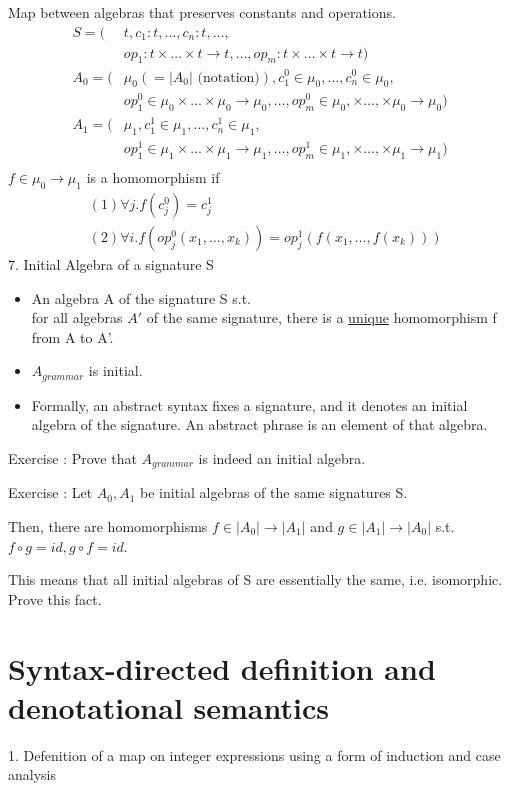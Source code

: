 \documentclass{report}[12pt]
\begin{document}
Map between algebras that preserves constants and operations.
\begin{align*}
    S=(&t, c_1:t, \ldots, c_n:t, \ldots, \\
    &op_1 :t\times \ldots \times t \rightarrow t , \ldots, op_m : t \times \ldots \times t \rightarrow t) \\
    A_0 = (&\mu_0(=|A_0|\text{ (notation)}), c_1^0 \in \mu_0, \ldots, c_n^0 \in \mu_0, \\
    &op_1^0 \in \mu_0 \times \ldots \times \mu_0 \rightarrow \mu_0, \ldots, op_m^0 \in \mu_0, \times \ldots, \times \mu_0 \rightarrow \mu_0) \\
    A_1 = (&\mu_1, c_1^1 \in \mu_1, \ldots, c_n^1 \in \mu_1, \\
    &op_1^1 \in \mu_1 \times \ldots \times \mu_1 \rightarrow \mu_1, \ldots, op_m^1 \in \mu_1, \times \ldots, \times \mu_1 \rightarrow \mu_1) \\
\end{align*}
$f\in \mu_0 \rightarrow \mu_1$ is a homomorphism if
\begin{align*}
    &(1) \forall j. f(c_j^0) = c_j^1  \\
    &(2) \forall i. f(op_j^0(x_1, \ldots, x_k)) = op_j^1 (f(x_1, \ldots, f(x_k)))
\end{align*}
7. Initial Algebra of a signature S

\begin{itemize}
    \item An algebra A of the signature S s.t. \\
    for all algebras $A'$ of the same signature, there is a \underline{unique} homomorphism f from A to A'.
    \item $A_{grammar}$ is initial.
    \item Formally, an abstract syntax fixes a signature, and it denotes an initial algebra of the signature. An abstract phrase is an element of that algebra.
\end{itemize}
Exercise : Prove that $A_{grammar}$ is indeed an initial algebra.

Exercise : Let $A_0, A_1$ be initial algebras of the same signatures S.

Then, there are homomorphisms $f\in |A_0| \rightarrow |A_1|$ and $g \in |A_1| \rightarrow |A_0|$ s.t. $f\circ g = id, g\circ f = id$.

This means that all initial algebras of S are essentially the same, i.e. isomorphic. Prove this fact.
\section{Syntax-directed definition and denotational semantics}
1. Defenition of a map on integer expressions using a form of induction and case analysis
\end{document}
